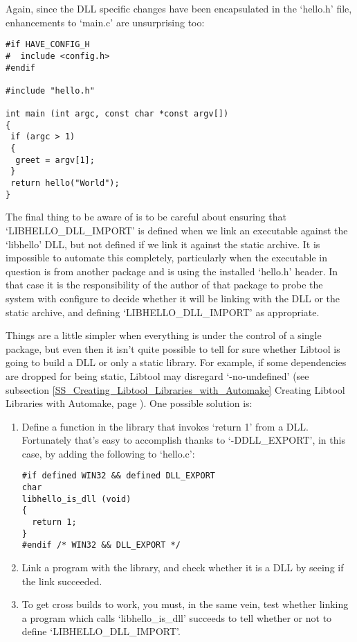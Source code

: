 Again, since the DLL specific changes have been encapsulated in the `hello.h' file, enhancements to `main.c' are unsurprising too:

 	


\begin{Verbatim}[frame=single]
#if HAVE_CONFIG_H
#  include <config.h>
#endif

#include "hello.h"

int main (int argc, const char *const argv[])
{
 if (argc > 1)
 {
  greet = argv[1];
 }
 return hello("World");
}
\end{Verbatim}

The final thing to be aware of is to be careful about ensuring that `LIBHELLO\_{}DLL\_{}IMPORT' is defined when we link an executable against the `libhello' DLL, but not defined if we link it against the static archive. It is impossible to automate this completely, particularly when the executable in question is from another package and is using the installed `hello.h' header. In that case it is the responsibility of the author of that package to probe the system with configure to decide whether it will be linking with the DLL or the static archive, and defining `LIBHELLO\_{}DLL\_{}IMPORT' as appropriate.

Things are a little simpler when everything is under the control of a single 
package, but even then it isn't quite possible to tell for sure whether 
Libtool is going to build a DLL or only a static library. For example, if 
some dependencies are dropped for being static, Libtool may 
disregard `-no-undefined'
(see subsection \ref{SS_Creating_Libtool_Libraries_with_Automake}
Creating Libtool Libraries with Automake,
page \pageref{SS_Creating_Libtool_Libraries_with_Automake}).
One possible solution is: 

\begin{enumerate}
\item Define a function in the library that invokes `return 1' from a DLL.
Fortunately that's easy to accomplish thanks to `-DDLL\_{}EXPORT', in this 
case, by adding the following to `hello.c':

 	

\begin{Verbatim}[frame=single]
#if defined WIN32 && defined DLL_EXPORT
char
libhello_is_dll (void)
{
  return 1;
}
#endif /* WIN32 && DLL_EXPORT */
\end{Verbatim}

\item Link a program with the library, and check whether it is a DLL by seeing if the link succeeded.

\item To get cross builds to work, you must, in the same vein, test whether linking a program which calls `libhello\_{}is\_{}dll' succeeds to tell whether or not to define `LIBHELLO\_{}DLL\_{}IMPORT'.
\end{enumerate}

